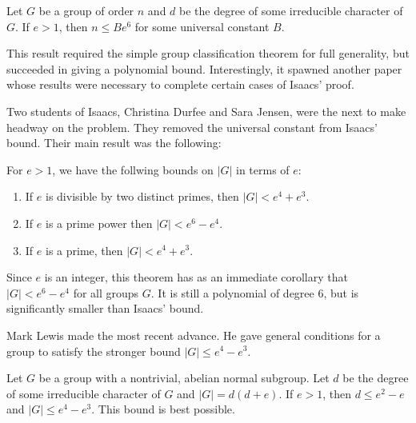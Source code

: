 \documentclass[main.tex]{subfiles}
\begin{document}
\begin{theorem} Let $G$ be a group of order $n$ and $d$ be the degree of some irreducible character of $G$. If $e > 1$, then $n \le Be^6$ for some universal constant $B$.
\end{theorem}

\hss

This result required the simple group classification theorem for full generality, but succeeded in giving a polynomial bound. Interestingly, it spawned another paper \cite{larsenmalletieparticle} whose results were necessary to complete certain cases of Isaacs' proof.

Two students of Isaacs, Christina Durfee and Sara Jensen, were the next to make headway on the problem. They removed the universal constant from Isaacs' bound. Their main result was the following:

\hss

\begin{theorem}
For $e > 1$, we have the follwing bounds on $|G|$ in terms of $e$:
\begin{enumerate}
	\item If $e$ is divisible by two distinct primes, then $|G| < e^4 + e^3$.
	\item If $e$ is a prime power then $|G| < e^6 - e^4$.
	\item If $e$ is a prime, then $|G| < e^4 + e^3$.
\end{enumerate}
\end{theorem}

\hss

\noindent Since $e$ is an integer, this theorem has as an immediate corollary that $|G| < e^6 - e^4$ for all groups $G$. It is still a polynomial of degree 6, but is significantly smaller than Isaacs' bound.

Mark Lewis made the most recent advance. He gave general conditions \cite{lewisarticle} for a group to satisfy the stronger bound $|G| \le e^4 - e^3$.

\hss

\begin{theorem} Let $G$ be a group with a nontrivial, abelian normal subgroup. Let $d$ be the degree of some irreducible character of $G$ and $|G| = d(d+e)$. If $e > 1$, then $d \le e^2 - e$ and $|G| \le e^4 - e^3$. This bound is best possible.
\end{theorem}

\hss
\end{document}
